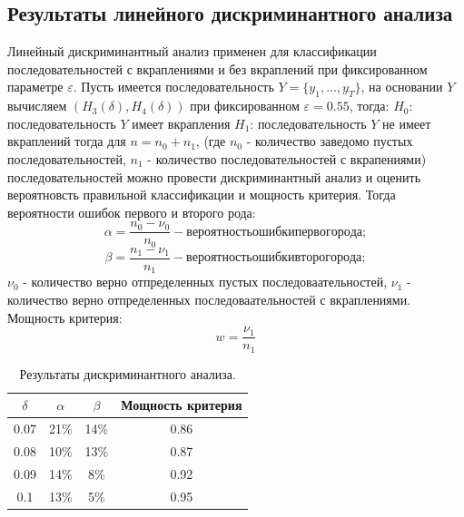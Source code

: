 ﻿\documentclass[a4paper,12pt]{article}
\theoremstyle{plain}
\begin{document}
\subsection{Результаты линейного дискриминантного анализа}
Линейный дискриминантный анализ применен для классификации последовательностей с вкраплениями и без вкраплений при фиксированном параметре $\varepsilon$.\newline
Пусть имеется последовательность $Y=\{y_1,...,y_T\}$, на основании $Y$ вычисляем $(H_3(\delta), H_4(\delta))$ при фиксированном $\varepsilon=0.55$, тогда:\newline
$H_0$: последовательность $Y$ имеет вкрапления\newline
$H_1$: последовательность $Y$ не имеет вкраплений\newline
тогда для $n=n_0+n_1$, (где $n_0$ - количество заведомо пустых последовательностей, $n_1$ - количество последовательностей с вкрапениями) последовательностей можно провести дискриминантный анализ и оценить вероятновсть правильной классификации и мощность критерия. \newline
Тогда вероятности ошибок первого и второго рода:
\begin{equation}
\alpha = \frac{n_0-\nu_0}{n_0} - вероятность ошибки первого рода;
\end{equation}
\begin{equation}
\beta = \frac{n_1-\nu_1}{n_1} - вероятность ошибки второго рода;
\end{equation}
$\nu_0$ - количество верно отпределенных пустых последоваательностей,
$\nu_1$ - количество верно отпределенных последоваательностей с вкраплениями.\newline
Мощность критерия:
\begin{equation}
w = \frac{\nu_1}{n_1} 
\end{equation}



\begin{table} [h] 	
	\begin{center}
		\begin{tabular}{|c|c|c|c|}
			\hline
			$\delta$ &  $\alpha$ &  $\beta$ & Мощность критерия \\
			\hline
			0.07 & 21\% & 14\% & 0.86\\  		
			\hline
			0.08 & 10\% & 13\% & 0.87\\  		
			\hline
			0.09 & 14\% & 8\% & 0.92\\  		
			\hline
			0.1 & 13\% & 5\% & 0.95\\  		
			\hline			
		\end{tabular}
	\end{center}
	\caption{\label{tab:canonsummary}Результаты дискриминантного анализа.}
\end{table} 
\end{document}
